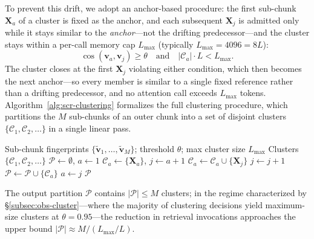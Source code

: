 \documentclass[10pt,conference]{IEEEtran}
\begin{document}
To prevent this drift, we adopt an anchor-based procedure: the first
sub-chunk $\mathbf{X}_a$ of a cluster is fixed as the anchor, and each
subsequent $\mathbf{X}_j$ is admitted only while it stays similar to the
\emph{anchor}---not the drifting predecessor---and the cluster stays within
a per-call memory cap $L_{\max}$ (typically $L_{\max}=4096=8L$):
\begin{equation}
    \cos(\mathbf{v}_a, \mathbf{v}_j) \geq \theta \quad \text{and} \quad |\mathcal{C}_a| \cdot L < L_{\max}.
    \label{eq:scr-admission}
\end{equation}
The cluster closes at the first $\mathbf{X}_j$ violating either condition,
which then becomes the next anchor---so every member is similar to a
single fixed reference rather than a drifting predecessor, and no
attention call exceeds $L_{\max}$ tokens.
Algorithm~\ref{alg:scr-clustering} formalizes the full clustering 
procedure, which partitions the $M$ sub-chunks of an outer chunk 
into a set of disjoint clusters $\{\mathcal{C}_1, \mathcal{C}_2, \ldots\}$ 
in a single linear pass.

\begin{algorithm}[t]
\caption{Anchor-based clustering of sub-chunks.}
\label{alg:scr-clustering}
\begin{algorithmic}[1]
\Require Sub-chunk fingerprints $\{\tilde{\mathbf{v}}_1, \ldots, \tilde{\mathbf{v}}_M\}$; threshold $\theta$; max cluster size $L_{\max}$
\Ensure Clusters $\{\mathcal{C}_1, \mathcal{C}_2, \ldots\}$
\State $\mathcal{P} \gets \emptyset$, $a \gets 1$
    \State $\mathcal{C}_a \gets \{\mathbf{X}_a\}$, $j \gets a + 1$
        \State $\mathcal{C}_a \gets \mathcal{C}_a \cup \{\mathbf{X}_j\}$
        \State $j \gets j + 1$
    \EndWhile
    \State $\mathcal{P} \gets \mathcal{P} \cup \{\mathcal{C}_a\}$
    \State $a \gets j$
\EndWhile
\State \Return $\mathcal{P}$
\end{algorithmic}
\end{algorithm}

The output partition $\mathcal{P}$ contains $|\mathcal{P}| \leq M$ 
clusters; in the regime characterized by 
§\ref{subsec:obs-cluster}---where the majority of clustering 
decisions yield maximum-size clusters at $\theta = 0.95$---the 
reduction in retrieval invocations approaches the upper bound
$|\mathcal{P}| \approx M / (L_{\max}/L)$.
\end{document}
